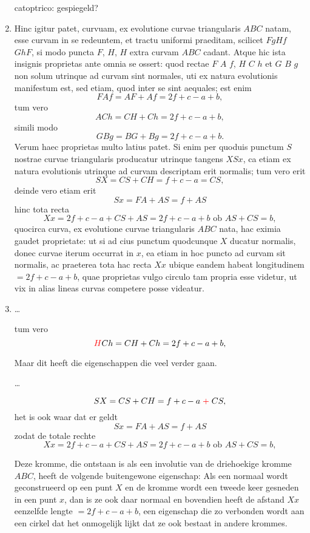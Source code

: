 \documentclass[10pt,a4paper]{article}
\newcommand{\switchenum}{\setcounter{enumi}{\arabic{enumi}-1}\switchcolumn}
\begin{document}
\begin{paracol}{2}
\begin{enumerate}[topsep=1px]
		
		\par catoptrico: gespiegeld?
		\switchcolumn*
		
		\item Hinc igitur patet, curvuam, ex evolutione curvae triangularis $ABC$ natam, esse curvam in se redeuntem, et tractu uniformi praeditam, scilicet $F g H f$ $G h F$, si modo puncta $F$, $H$, $H$ extra curvam $ABC$ cadant. Atque hic ista insignis proprietas ante omnia se ossert: quod rectae $F$ $A$ $f$, $H$ $C$ $h$ et $G$ $B$ $g$ non solum utrinque ad curvam sint normales, uti ex natura evolutionis manifestum est, sed etiam, quod inter se sint aequales; est enim
		\[
			F A f = AF + Af = 2f + c - a + b,
		\]
		tum vero
		\[
			A C h = CH + Ch = 2f + c - a + b,
		\]
		simili modo
		\[
			G B g = BG + Bg = 2f + c - a + b.
		\]
		Verum haec proprietas multo latius patet. Si enim per quoduis punctum $S$ nostrae curvae triangularis producatur utrinque tangens $X S x$, ca etiam ex natura evolutionis utrinque ad curvam descriptam erit normalis; tum vero erit
		\[
			SX = CS + CH = f + c - a = CS,
		\]
		deinde vero etiam erit
		\[
			Sx = FA + AS = f + AS
		\]
		hinc tota recta
		\[
			Xx = 2f + c - a + CS + AS = 2f + c - a + b \text{ ob } AS + CS = b,
		\]
		quocirca curva, ex evolutione curvae triangularis $ABC$ nata, hac eximia gaudet proprietate: ut si ad cius punctum quodcunque $X$ ducatur normalis, donec curvae iterum occurrat in $x$, ea etiam in hoc puncto ad curvam sit normalis, ac praeterea tota hac recta $Xx$ ubique eandem habeat longitudinem $= 2f +c-a+b$, quae proprietas vulgo circulo tam propria esse videtur, ut vix in alias lineas curvas competere posse videatur.
		
		\switchenum
		\item \ldots
		
		\par tum vero
		\[
			{\color{red}H} C h = CH + Ch = 2f + c - a + b,
		\]
		
		\par Maar dit heeft die eigenschappen die veel verder gaan. 
		\par \ldots
		
		\[
			SX = CS + CH = f + c - a {\color{red}\;+\;} CS,
		\]
		het is ook waar dat er geldt
		\[
			Sx = FA + AS = f + AS
		\]
		zodat de totale rechte
		\[
			Xx = 2f + c - a + CS + AS = 2f + c - a + b \text{ ob } AS + CS = b,
		\]
		\par Deze kromme, die ontstaan is als een involutie van de driehoekige kromme $ABC$, heeft de volgende buitengewone eigenschap: Als een normaal wordt geconstrueerd op een punt $X$ en de kromme wordt een tweede keer gesneden in een punt $x$, dan is ze ook daar normaal en bovendien heeft de afstand $Xx$ eenzelfde lengte $= 2f+c-a+b$, een eigenschap die zo verbonden wordt aan een cirkel dat het onmogelijk lijkt dat ze ook bestaat in andere krommes.
		

\end{enumerate}
\end{paracol}
\end{document}
